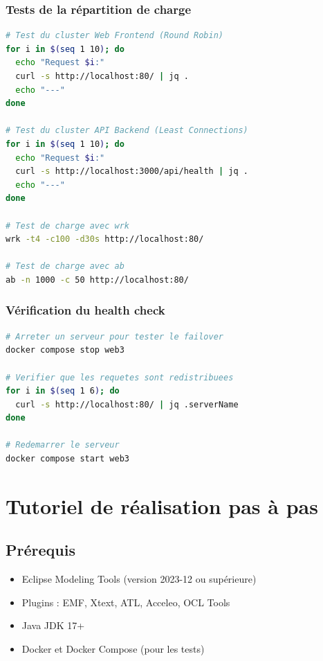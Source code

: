 \documentclass[12pt,a4paper]{report}
\begin{document}
\subsection{Tests de la répartition de charge}

\begin{lstlisting}[language=bash, caption={Tests de vérification}]
# Test du cluster Web Frontend (Round Robin)
for i in $(seq 1 10); do
  echo "Request $i:"
  curl -s http://localhost:80/ | jq .
  echo "---"
done

# Test du cluster API Backend (Least Connections)
for i in $(seq 1 10); do
  echo "Request $i:"
  curl -s http://localhost:3000/api/health | jq .
  echo "---"
done

# Test de charge avec wrk
wrk -t4 -c100 -d30s http://localhost:80/

# Test de charge avec ab
ab -n 1000 -c 50 http://localhost:80/
\end{lstlisting}

\subsection{Vérification du health check}

\begin{lstlisting}[language=bash, caption={Test du health check}]
# Arreter un serveur pour tester le failover
docker compose stop web3

# Verifier que les requetes sont redistribuees
for i in $(seq 1 6); do
  curl -s http://localhost:80/ | jq .serverName
done

# Redemarrer le serveur
docker compose start web3
\end{lstlisting}

\chapter{Tutoriel de réalisation pas à pas}

\section{Prérequis}

\begin{itemize}
  \item Eclipse Modeling Tools (version 2023-12 ou supérieure)
  \item Plugins : EMF, Xtext, ATL, Acceleo, OCL Tools
  \item Java JDK 17+
  \item Docker et Docker Compose (pour les tests)
\end{itemize}
\end{document}

